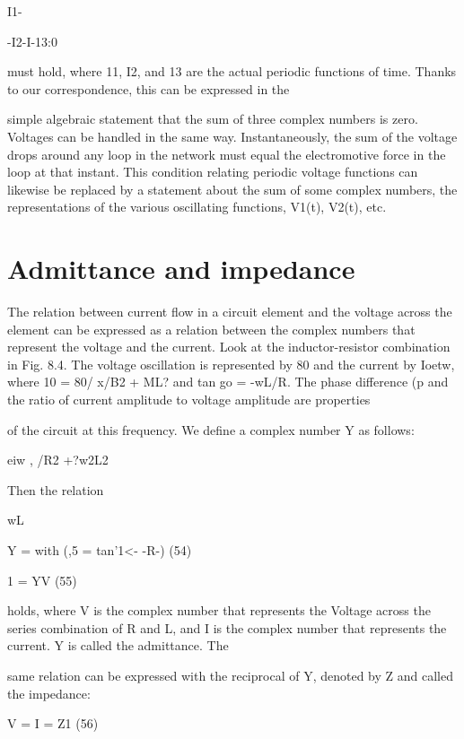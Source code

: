 I1-{-I2-I-13:0 

must hold, where 11, I2, and 13 are the actual periodic functions of
time. Thanks to our correspondence, this can be expressed in the

simple algebraic statement that the sum of three complex numbers
is zero. Voltages can be handled in the same way. Instantaneously,
the sum of the voltage drops around any loop in the network must
equal the electromotive force in the loop at that instant. This condition
relating periodic voltage functions can likewise be replaced by
a statement about the sum of some complex numbers, the representations
of the various oscillating functions, V1(t), V2(t), etc.

\section{Admittance and impedance}

The relation between current flow in a circuit element and the
voltage across the element can be expressed as a relation between the
complex numbers that represent the voltage and the current. Look
at the inductor-resistor combination in Fig. 8.4. The voltage oscillation
is represented by 80 and the current by Ioetw, where 10 =
80/ x/B2 + ML? and tan go = -wL/R. The phase difference (p and
the ratio of current amplitude to voltage amplitude are properties

of the circuit at this frequency. We define a complex number Y as
follows:

\begin{equation}
\end{equation}
eiw
, /R2 +?w2L2

Then the relation

\begin{equation}
\end{equation}
wL

Y = with (,5 = tan'1<- -R-) (54)

\begin{equation}
\end{equation}
1 = YV (55)

holds, where V is the complex number that represents the Voltage
across the series combination of R and L, and I is the complex number
that represents the current. Y is called the admittance. The

same relation can be expressed with the reciprocal of Y, denoted by
Z and called the impedance:

\begin{equation}
\end{equation}
V =  I = Z1 (56)

}
